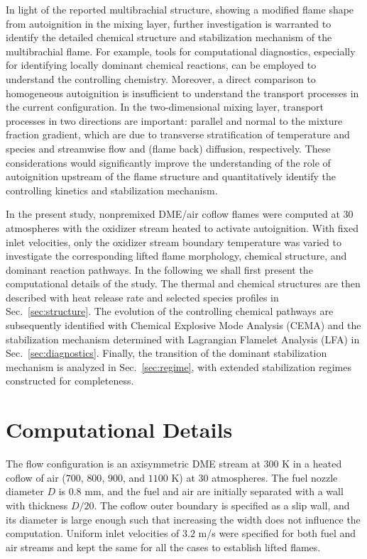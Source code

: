 \documentclass[review,3p,times]{elsarticle}
\begin{document}
In light of the reported multibrachial structure, showing a modified flame shape from autoignition in the mixing layer, further investigation is warranted to identify the detailed chemical structure and stabilization mechanism of the multibrachial flame.  For example, tools for computational diagnostics, especially for identifying locally dominant chemical reactions, can be employed to understand the controlling chemistry.  Moreover, a direct comparison to homogeneous autoignition is insufficient to understand the transport processes in the current configuration.  In the two-dimensional mixing layer, transport processes in two directions are important: parallel and normal to the mixture fraction gradient, which are due to transverse stratification of temperature and species and streamwise flow and (flame back) diffusion, respectively.  These considerations would significantly improve the understanding of the role of autoignition upstream of the flame structure and quantitatively identify the controlling kinetics and stabilization mechanism.     

In the present study, nonpremixed DME/air coflow flames were computed at $30$ atmospheres with the oxidizer stream heated to activate autoignition.  With fixed inlet velocities, only the oxidizer stream boundary temperature was varied to investigate the corresponding lifted flame morphology, chemical structure, and dominant reaction pathways.  \textcolor{mycolor}{In the following we shall first present the computational details of the study.  The thermal and chemical structures are then described with heat release rate and selected species profiles in Sec.~\ref{sec:structure}.  The evolution of the controlling chemical pathways are subsequently identified with Chemical Explosive Mode Analysis (CEMA) and the stabilization mechanism determined with Lagrangian Flamelet Analysis (LFA) in Sec.~\ref{sec:diagnostics}.  Finally, the transition of the dominant stabilization mechanism is analyzed in Sec.~\ref{sec:regime}, with extended stabilization regimes constructed for completeness.}


\section{Computational Details} \label{sec:computation}

\textcolor{mycolor}{The flow configuration is an axisymmetric DME stream at $300$ K in a heated coflow of air ($700$, $800$, $900$, and $1100$ K) at $30$ atmospheres.  The fuel nozzle diameter $D$ is $0.8$ mm, and the fuel and air are initially separated with a wall with thickness $D/20$.  The coflow outer boundary is specified as a slip wall, and its diameter is large enough such that increasing the width does not influence the computation.  Uniform inlet velocities of $3.2$ m/s were specified for both fuel and air streams and kept the same for all the cases to establish lifted flames.}
\end{document}
